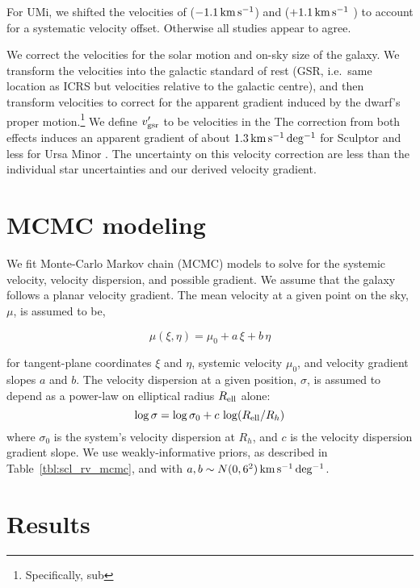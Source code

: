 For UMi, we shifted the velocities of \citet{spencer+2018}
(\(-1.1\,{\rm km\,s^{-1}}\)) and \citet{pace+2020} (\(+1.1\,{\rm km\,s^{-1}}\) ) to account for
a systematic velocity offset. Otherwise all studies appear to agree.

We correct the velocities for the solar motion and on-sky size of the
galaxy. We transform the velocities into the galactic standard of rest
(GSR, i.e.~same location as ICRS but velocities relative to the galactic
centre), and then transform velocities to correct for the apparent
gradient induced by the dwarf's proper motion.\footnote{Specifically,
  sub} We define \(v_{\rm gsr}'\) to be velocities in the The correction
from both effects induces an apparent gradient of about \(1.3\,{\rm km\,s^{-1}\,deg^{-1}}\)
for Sculptor and less for Ursa Minor \citep[see
also][]{WMO2008, strigari2010}. The uncertainty on this velocity
correction are less than the individual star uncertainties and our
derived velocity gradient.

\section{MCMC modeling}\label{mcmc-modeling}

We fit Monte-Carlo Markov chain (MCMC) models to solve for the systemic
velocity, velocity dispersion, and possible gradient. We assume that the
galaxy follows a planar velocity gradient. The mean velocity at a given
point on the sky, \(\mu\), is assumed to be,

\begin{equation}{
\mu(\xi, \eta) = \mu_0 + a\,\xi + b\,\eta
}\end{equation}

for tangent-plane coordinates \(\xi\) and \(\eta\), systemic velocity
\(\mu_0\), and velocity gradient slopes \(a\) and \(b\). The velocity
dispersion at a given position, \(\sigma\), is assumed to depend as a
power-law on elliptical radius \(R_{\rm ell}\) alone: \begin{equation}{
\log \sigma = \log \sigma_0 + c\,\log(R_{\rm ell} / R_h)
}\end{equation} where \(\sigma_0\) is the system's velocity dispersion
at \(R_h\), and \(c\) is the velocity dispersion gradient slope. We use
weakly-informative priors, as described in Table~\ref{tbl:scl_rv_mcmc},
and with \(a, b \sim N(0, 6^2)\,{\rm km\,s^{-1}\,deg^{-1}}\).

\section{Results}\label{sec:rv_results}

